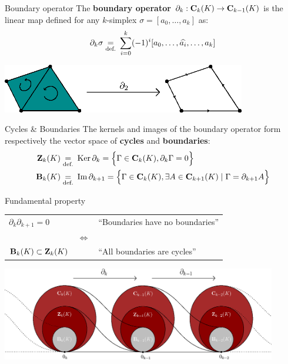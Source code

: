 \begin{frame}{Boundary operator}
	The \textbf{boundary operator} $\partial_k : \mathbf{C}_{k}(K) \to \mathbf{C}_{k-1}(K)$ is the linear map defined for any $k$-simplex $\sigma = [a_0, \dots, a_k]$ as:
	\[
	\partial_k \sigma  \underset{\text{def.}}{=} \:\sum_{i=0}^{k} (-1)^{i} [a_0,\dots, \widehat{a_i},\dots, a_k]
	\]
	
	\begin{center}
		\includegraphics[width=0.8\textwidth]{course/boundary}
	\end{center}
\end{frame}

\begin{frame}{Cycles \& Boundaries}
	The kernels and images of the boundary operator form respectively the vector space of \textbf{cycles} and \textbf{boundaries}:
	\begin{align*}
		\mathbf{Z}_{k}(K) &\underset{\text{def.}}{=} \: \operatorname{Ker} \partial_k = \Big\{ \Gamma \in \mathbf{C}_{k}(K), \partial_k \Gamma = 0 \Big\} 
		\\
		\mathbf{B}_k(K) &\underset{\text{def.}}{=} \: \operatorname{Im} \partial_{k+1} = \Big\{ \Gamma \in \mathbf{C}_{k}(K), \exists A \in \mathbf{C}_{k+1}(K) \mid \Gamma = \partial_{k+1} A \Big\} 
	\end{align*}
\end{frame}

\begin{frame}{Fundamental property}
	\begin{tabular}{lcl}
	$\partial_{k} \partial_{k+1} = 0$ && ``Boundaries have no boundaries'' \\
	\pause
	& $\iff$ & \\
	$\mathbf{B}_k(K) \subset \mathbf{Z}_k(K)$ && ``All boundaries are cycles''
	\end{tabular}

	\pause
	\begin{center}
		\includegraphics[width=0.9\textwidth]{course/sequence}
	\end{center}
\end{frame}

